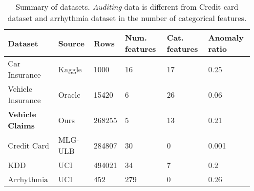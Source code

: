 \documentclass{article}
\begin{document}
\begin{table}[htbp]
\caption{Summary of datasets. \textit{Auditing} data is different from Credit card dataset and arrhythmia dataset in the number of categorical features.}
\label{tab:2.1}
\begin{tabular}{llllll}
\hline
Dataset           & Source & Rows   & Num. features & Cat. features & Anomaly ratio \\ \hline
Car Insurance     & Kaggle & 1000   & 16                 & 17                   & 0.25          \\ 
Vehicle Insurance & Oracle & 15420  & 6                  & 26                   & 0.06          \\ 
\textbf{Vehicle Claims}    & Ours    & 268255 & 5                  & 13                   & 0.21          \\ 
Credit Card       & MLG-ULB & 284807 & 30                 & 0                    & 0.001         \\ 
KDD            & UCI    & 494021 & 34                 & 7                    & 0.2
        \\ 

Arrhythmia        & UCI    & 452    & 279                & 0                    & 0.26          \\ \hline
\end{tabular}
\end{table}
\end{document}
